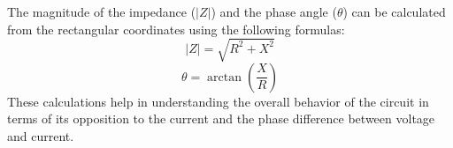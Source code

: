 The magnitude of the impedance (\(|Z|\)) and the phase angle (\(\theta\)) can be calculated from the rectangular coordinates using the following formulas:
\[
|Z| = \sqrt{R^2 + X^2}
\]
\[
\theta = \arctan\left(\frac{X}{R}\right)
\]
These calculations help in understanding the overall behavior of the circuit in terms of its opposition to the current and the phase difference between voltage and current.

